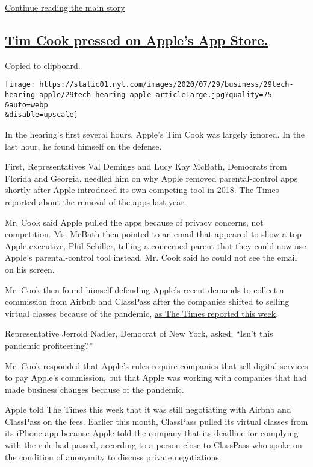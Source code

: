 \protect\hyperlink{after-dfp-ad-mid2}{Continue reading the main story}

\hypertarget{tim-cook-pressed-on-apples-app-store}{%
\subsection{\texorpdfstring{\protect\hyperlink{tim-cook-pressed-on-apples-app-store}{Tim
Cook pressed on Apple's App
Store.}}{Tim Cook pressed on Apple's App Store.}}\label{tim-cook-pressed-on-apples-app-store}}

Copied to clipboard.

\texttt{[image: https://static01.nyt.com/images/2020/07/29/business/29tech-hearing-apple/29tech-hearing-apple-articleLarge.jpg?quality=75\\\&auto=webp\\\&disable=upscale]}

In the hearing's first several hours, Apple's Tim Cook was largely
ignored. In the last hour, he found himself on the defense.

First, Representatives Val Demings and Lucy Kay McBath, Democrats from
Florida and Georgia, needled him on why Apple removed parental-control
apps shortly after Apple introduced its own competing tool in 2018.
\href{https://www.nytimes.com/2019/04/27/technology/apple-screen-time-trackers.html}{The
Times reported about the removal of the apps last year}.

Mr. Cook said Apple pulled the apps because of privacy concerns, not
competition. Ms. McBath then pointed to an email that appeared to show a
top Apple executive, Phil Schiller, telling a concerned parent that they
could now use Apple's parental-control tool instead. Mr. Cook said he
could not see the email on his screen.

Mr. Cook then found himself defending Apple's recent demands to collect
a commission from Airbnb and ClassPass after the companies shifted to
selling virtual classes because of the pandemic,
\href{https://www.nytimes.com/2020/07/28/technology/apple-app-store-airbnb-classpass.html}{as
The Times reported this week}.

Representative Jerrold Nadler, Democrat of New York, asked: ``Isn't this
pandemic profiteering?''

Mr. Cook responded that Apple's rules require companies that sell
digital services to pay Apple's commission, but that Apple was working
with companies that had made business changes because of the pandemic.

Apple told The Times this week that it was still negotiating with Airbnb
and ClassPass on the fees. Earlier this month, ClassPass pulled its
virtual classes from its iPhone app because Apple told the company that
its deadline for complying with the rule had passed, according to a
person close to ClassPass who spoke on the condition of anonymity to
discuss private negotiations.

